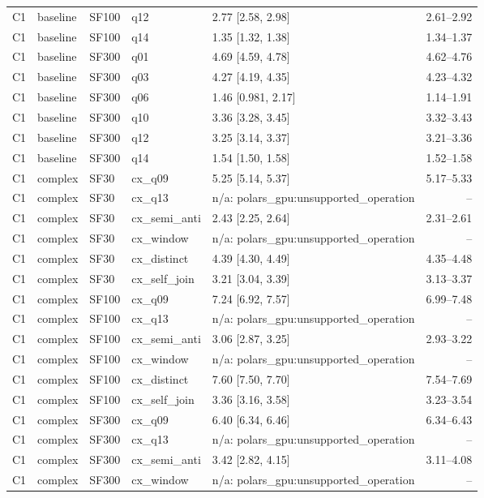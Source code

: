 \begin{longtable}{lllllr}
C1 & baseline & SF100 & q12 & 2.77 [2.58, 2.98] & 2.61--2.92 \\
C1 & baseline & SF100 & q14 & 1.35 [1.32, 1.38] & 1.34--1.37 \\
C1 & baseline & SF300 & q01 & 4.69 [4.59, 4.78] & 4.62--4.76 \\
C1 & baseline & SF300 & q03 & 4.27 [4.19, 4.35] & 4.23--4.32 \\
C1 & baseline & SF300 & q06 & 1.46 [0.981, 2.17] & 1.14--1.91 \\
C1 & baseline & SF300 & q10 & 3.36 [3.28, 3.45] & 3.32--3.43 \\
C1 & baseline & SF300 & q12 & 3.25 [3.14, 3.37] & 3.21--3.36 \\
C1 & baseline & SF300 & q14 & 1.54 [1.50, 1.58] & 1.52--1.58 \\
C1 & complex & SF30 & cx\_q09 & 5.25 [5.14, 5.37] & 5.17--5.33 \\
C1 & complex & SF30 & cx\_q13 & n/a: polars\_gpu:unsupported\_operation & -- \\
C1 & complex & SF30 & cx\_semi\_anti & 2.43 [2.25, 2.64] & 2.31--2.61 \\
C1 & complex & SF30 & cx\_window & n/a: polars\_gpu:unsupported\_operation & -- \\
C1 & complex & SF30 & cx\_distinct & 4.39 [4.30, 4.49] & 4.35--4.48 \\
C1 & complex & SF30 & cx\_self\_join & 3.21 [3.04, 3.39] & 3.13--3.37 \\
C1 & complex & SF100 & cx\_q09 & 7.24 [6.92, 7.57] & 6.99--7.48 \\
C1 & complex & SF100 & cx\_q13 & n/a: polars\_gpu:unsupported\_operation & -- \\
C1 & complex & SF100 & cx\_semi\_anti & 3.06 [2.87, 3.25] & 2.93--3.22 \\
C1 & complex & SF100 & cx\_window & n/a: polars\_gpu:unsupported\_operation & -- \\
C1 & complex & SF100 & cx\_distinct & 7.60 [7.50, 7.70] & 7.54--7.69 \\
C1 & complex & SF100 & cx\_self\_join & 3.36 [3.16, 3.58] & 3.23--3.54 \\
C1 & complex & SF300 & cx\_q09 & 6.40 [6.34, 6.46] & 6.34--6.43 \\
C1 & complex & SF300 & cx\_q13 & n/a: polars\_gpu:unsupported\_operation & -- \\
C1 & complex & SF300 & cx\_semi\_anti & 3.42 [2.82, 4.15] & 3.11--4.08 \\
C1 & complex & SF300 & cx\_window & n/a: polars\_gpu:unsupported\_operation & -- \\

\end{longtable}
